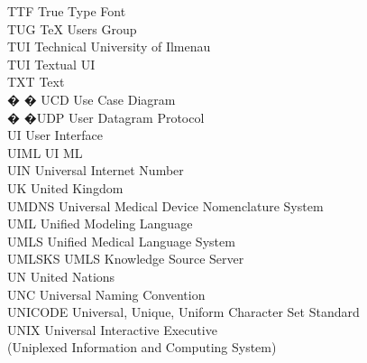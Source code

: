 \begin{tabbing}
    \>TTF \>\>True Type Font\\

    \>TUG \>\>TeX Users Group\\

    \>TUI \>\>Technical University of Ilmenau\\

    \>TUI \>\>Textual UI\\

    \>TXT \>\>Text\\



� � \>UCD \>\>Use Case Diagram\\

 � �\>UDP \>\>User Datagram Protocol\\

    \>UI \>\>User Interface\\

    \>UIML \>\>UI ML\\

    \>UIN \>\>Universal Internet Number\\

    \>UK \>\>United Kingdom\\

    \>UMDNS \>\>Universal Medical Device Nomenclature System\\

    \>UML \>\>Unified Modeling Language\\

    \>UMLS \>\>Unified Medical Language System\\

    \>UMLSKS \>\>UMLS Knowledge Source Server\\


    \>UN \>\>United Nations\\

    \>UNC \>\>Universal Naming Convention\\

    \>UNICODE \>\>Universal, Unique, Uniform Character Set Standard\\

    \>UNIX \>\>Universal Interactive Executive\\
        \>\>\>(Uniplexed Information and Computing System)\\


\end{tabbing}
